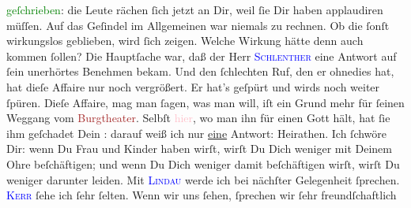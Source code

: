                   \textcolor{green}{geſchrieben}{}\ledrightnote{{$\rightarrow$}\textcolor{green}{[Burckhard über Schnitzler-Schlenther]}}: die Leute
               rächen ſich jetzt an Dir, weil ſie Dir haben applaudiren müſſen. Auf das Geſindel im
               Allgemeinen war niemals zu rechnen. Ob die \label{K_L02936-3v}\label{K_L02936-3h} ſonſt wirkungslos geblieben, wird ſich zeigen. Welche Wirkung hätte {\pb}denn auch kommen ſollen? Die Hauptſache war, daß der
               Herr \textsc{\textcolor{blue}{Schlenther}{}\ledrightnote{\textcolor{blue}{Paul Schlenther}}} eine Antwort auf ſein unerhörtes Benehmen bekam. Und den ſchlechten Ruf, den er
               ohnedies hat, hat dieſe Affaire nur noch vergrößert. Er hat’s geſpürt und wirds noch
               weiter ſpüren. Dieſe Affaire, mag man ſagen, was man will, iſt ein Grund mehr für
               ſeinen Weggang vom \textcolor{brown}{Burgtheater}{}\ledrightnote{\textcolor{brown}{Burgtheater}}. Selbſt \textcolor{pink}{hier}{}\ledrightnote{{$\rightarrow$}\textcolor{pink}{Berlin}}, wo man ihn für einen Gott
               hält, hat ſie ihm geſchadet{\dotsfive}\pend
           \pstart
           Dein \label{K_L02936-4v}\label{K_L02936-4h}: darauf weiß
               ich nur \uline{eine} Antwort: Heirathen. Ich ſchwöre Dir:
               wenn Du Frau {\pb}und Kinder haben wirſt, wirſt Du Dich
               weniger mit Deinem Ohre beſchäftigen; und wenn Du Dich weniger damit beſchäftigen
               wirſt, \strikeout{\textcolor{gray}{r}\textcolor{gray}{×}\-\textcolor{gray}{×}} wirſt Du weniger darunter leiden.\pend
           \pstart
           Mit \textsc{\textcolor{blue}{Lindau}{}\ledrightnote{\textcolor{blue}{Paul Lindau}}} werde ich bei nächſter Gelegenheit \label{K_L02936-5v}\label{K_L02936-5h} ſprechen.\pend
           \pstart
           \textsc{\textcolor{blue}{Kerr}{}\ledrightnote{\textcolor{blue}{Alfred Kerr}}} ſehe ich ſehr ſelten. Wenn wir uns ſehen, ſprechen wir ſehr freundſchaftlich
